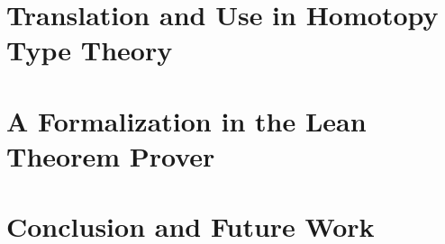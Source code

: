 \documentclass[12pt,headings=optiontohead]{book}
\theoremstyle{definition}
\begin{document}
 

\chapter{Translation and Use in Homotopy Type Theory} \label{chapter:types}



\chapter{A Formalization in the Lean Theorem Prover} \label{chapter:lean}



\chapter{Conclusion and Future Work} \label{chapter:outro}






\appendix



\end{document}
